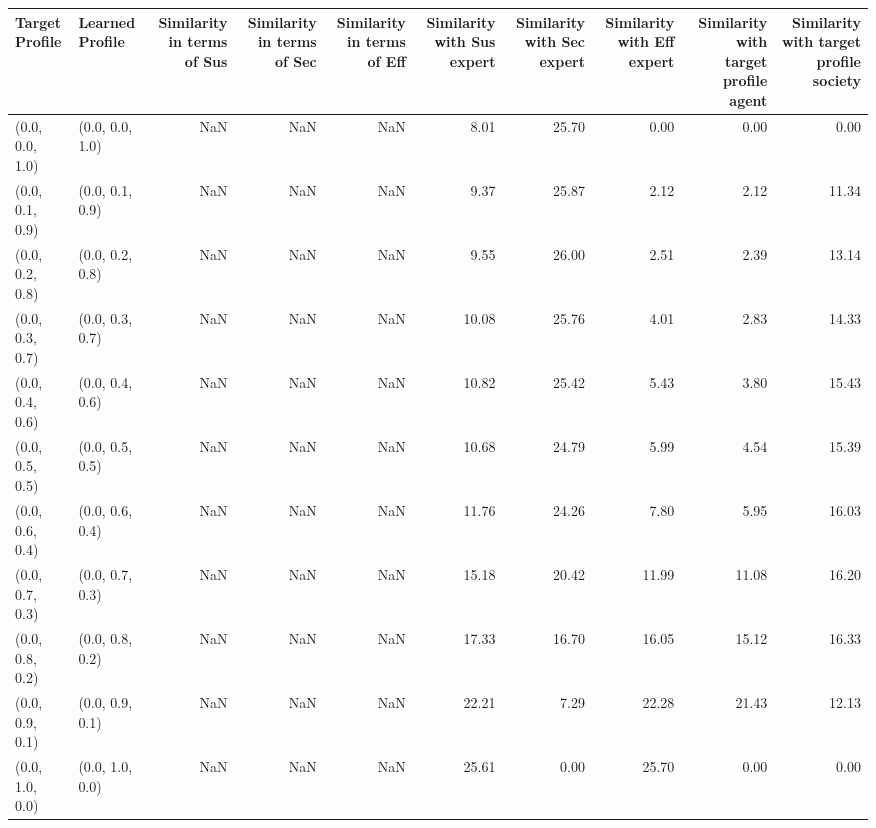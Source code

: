 \begin{tabular}{llrrrrrrrr}
\toprule
Target Profile & Learned Profile & Similarity in terms of Sus & Similarity in terms of Sec & Similarity in terms of Eff & Similarity with Sus expert & Similarity with Sec expert & Similarity with Eff expert & Similarity with target profile agent & Similarity with target profile society \\
\midrule
(0.0, 0.0, 1.0) & (0.0, 0.0, 1.0) & NaN & NaN & NaN & 8.01 & 25.70 & 0.00 & 0.00 & 0.00 \\
(0.0, 0.1, 0.9) & (0.0, 0.1, 0.9) & NaN & NaN & NaN & 9.37 & 25.87 & 2.12 & 2.12 & 11.34 \\
(0.0, 0.2, 0.8) & (0.0, 0.2, 0.8) & NaN & NaN & NaN & 9.55 & 26.00 & 2.51 & 2.39 & 13.14 \\
(0.0, 0.3, 0.7) & (0.0, 0.3, 0.7) & NaN & NaN & NaN & 10.08 & 25.76 & 4.01 & 2.83 & 14.33 \\
(0.0, 0.4, 0.6) & (0.0, 0.4, 0.6) & NaN & NaN & NaN & 10.82 & 25.42 & 5.43 & 3.80 & 15.43 \\
(0.0, 0.5, 0.5) & (0.0, 0.5, 0.5) & NaN & NaN & NaN & 10.68 & 24.79 & 5.99 & 4.54 & 15.39 \\
(0.0, 0.6, 0.4) & (0.0, 0.6, 0.4) & NaN & NaN & NaN & 11.76 & 24.26 & 7.80 & 5.95 & 16.03 \\
(0.0, 0.7, 0.3) & (0.0, 0.7, 0.3) & NaN & NaN & NaN & 15.18 & 20.42 & 11.99 & 11.08 & 16.20 \\
(0.0, 0.8, 0.2) & (0.0, 0.8, 0.2) & NaN & NaN & NaN & 17.33 & 16.70 & 16.05 & 15.12 & 16.33 \\
(0.0, 0.9, 0.1) & (0.0, 0.9, 0.1) & NaN & NaN & NaN & 22.21 & 7.29 & 22.28 & 21.43 & 12.13 \\
(0.0, 1.0, 0.0) & (0.0, 1.0, 0.0) & NaN & NaN & NaN & 25.61 & 0.00 & 25.70 & 0.00 & 0.00 \\
\bottomrule
\end{tabular}
